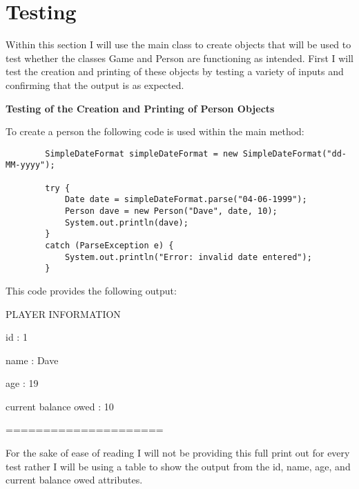 \documentclass[a4paper]{article}
\begin{document}
\section*{Testing}
Within this section I will use the main class to create objects that will be used to test whether the classes Game and Person are functioning as intended. First I will test the creation and printing of these objects by testing a variety of inputs and confirming that the output is as expected.\newline

\noindent \textbf{Testing of the Creation and Printing of Person Objects}

\noindent To create a person the following code is used within the main method:
\begin{lstlisting}
		SimpleDateFormat simpleDateFormat = new SimpleDateFormat("dd-MM-yyyy");

        try {
            Date date = simpleDateFormat.parse("04-06-1999");
            Person dave = new Person("Dave", date, 10);
            System.out.println(dave);
        }
        catch (ParseException e) {
            System.out.println("Error: invalid date entered");
        }
\end{lstlisting}

\noindent This code provides the following output:

\noindent \newline PLAYER INFORMATION

\noindent id : 1

\noindent name : Dave

\noindent age : 19

\noindent current balance owed : 10

\noindent =====================\newline

For the sake of ease of reading I will not be providing this full print out for every test rather I will be using a table to show the output from the id, name, age, and current balance owed attributes.
\end{document}
